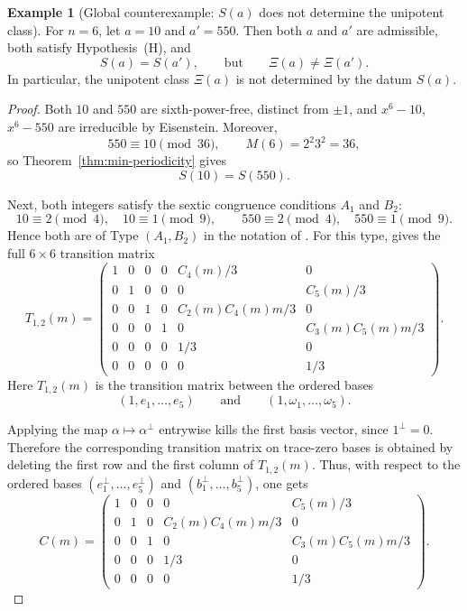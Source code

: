 \documentclass[11pt,letterpaper]{amsart}
\theoremstyle{plain}
\theoremstyle{definition}
\newtheorem{example}[theorem]{Example}
\begin{document}
\begin{example}[Global counterexample: \(S(a)\) does not determine the unipotent class]
\label{prop:counterexample-C}
For \(n=6\), let \(a=10\) and \(a'=550\).
Then both \(a\) and \(a'\) are admissible, both satisfy Hypothesis~\textup{(H)}, and
\[
S(a)=S(a'),
\qquad\text{but}\qquad
\Xi(a)\neq \Xi(a').
\]
In particular, the unipotent class \(\Xi(a)\) is not determined by the datum \(S(a)\).
\end{example}

\begin{proof}
Both $10$ and $550$ are sixth-power-free, distinct from $\pm1$, and $x^6-10$, $x^6-550$ are irreducible
by Eisenstein.
Moreover,
\[
550\equiv 10\pmod{36},
\qquad
M(6)=2^2 3^2=36,
\]
so Theorem~\ref{thm:min-periodicity} gives
\[
S(10)=S(550).
\]

Next, both integers satisfy the sextic congruence conditions $A_1$ and $B_2$:
\[
10\equiv 2\pmod4,\quad 10\equiv 1\pmod9,
\qquad
550\equiv 2\pmod4,\quad 550\equiv 1\pmod9.
\]
Hence both are of Type \((A_1,B_2)\) in the notation of
\cite[Table~1]{JakharKalwaniyaRayRoy2026}. For this type,
\cite[Proposition~3.4]{JakharKalwaniyaRayRoy2026} gives the full \(6\times6\)
transition matrix
\[
T_{1,2}(m)=
\begin{pmatrix}
1&0&0&0& C_4(m)/3 &0\\
0&1&0&0&0& C_5(m)/3\\
0&0&1&0& C_2(m)C_4(m)m/3 &0\\
0&0&0&1&0& C_3(m)C_5(m)m/3\\
0&0&0&0&1/3&0\\
0&0&0&0&0&1/3
\end{pmatrix}.
\]
Here \(T_{1,2}(m)\) is the transition matrix between the ordered bases
\[
(1,e_1,\dots,e_5)\qquad\text{and}\qquad (1,\omega_1,\dots,\omega_5).
\]

Applying the map \(\alpha\mapsto \alpha^\perp\) entrywise kills the first basis vector,
since \(1^\perp=0\). Therefore the corresponding transition matrix on trace-zero bases is
obtained by deleting the first row and the first column of \(T_{1,2}(m)\). Thus, with
respect to the ordered bases \((e_1^\perp,\dots,e_5^\perp)\) and
\((b_1^\perp,\dots,b_5^\perp)\), one gets
\[
C(m)=
\begin{pmatrix}
1&0&0&0&C_5(m)/3\\
0&1&0&C_2(m)C_4(m)m/3&0\\
0&0&1&0&C_3(m)C_5(m)m/3\\
0&0&0&1/3&0\\
0&0&0&0&1/3
\end{pmatrix}.
\]


\end{proof}
\end{document}
